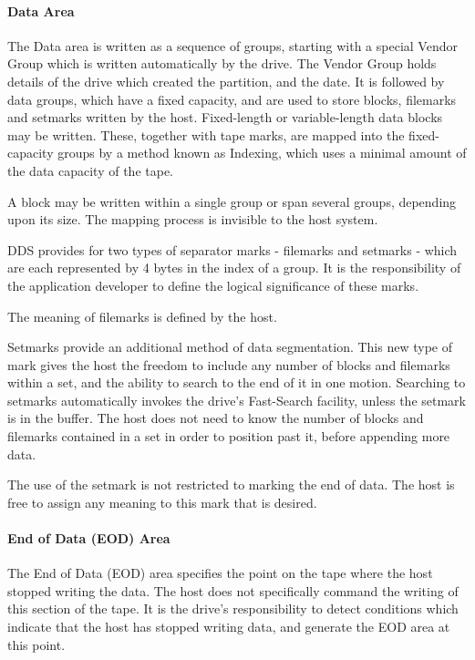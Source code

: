 \paragraph {Data Area}

The Data area is written as a sequence of groups, starting with a special
Vendor Group which is written automatically by the drive. The Vendor Group
holds details of the drive which created the partition, and the date. It is
followed by data groups, which have a fixed capacity, and are used to store
blocks, filemarks and setmarks written by the host. Fixed-length or
variable-length data blocks may be written. These, together with tape marks,
are mapped into the fixed-capacity groups by a method known as Indexing,
which uses a minimal amount of the data capacity of the tape.

A block may be written within a single group or span several groups,
depending upon its size. The mapping process is invisible to the host system.

DDS provides for two types of separator marks - filemarks and setmarks -
which are each represented by 4 bytes in the index of a group. It is the
responsibility of the application developer to define the logical
significance of these marks.

The meaning of filemarks is defined by the host.

Setmarks provide an additional method of data segmentation. This new type
of mark gives the host the freedom to include any number of blocks and
filemarks within a set, and the ability to search to the end of it in one
motion. Searching to setmarks automatically invokes the drive's Fast-Search
facility, unless the setmark is in the buffer. The host does not need to
know the number of blocks and filemarks contained in a set in order to
position past it, before appending more data.

The use of the setmark is not restricted to marking the end of data. The
host is free to assign any meaning to this mark that is desired.

\paragraph {End of Data (EOD) Area}

The End of Data (EOD) area specifies the point on the tape where the host
stopped writing the data. The host does not specifically command the writing
of this section of the tape. It is the drive's responsibility to detect
conditions which indicate that the host has stopped writing data, and generate
the EOD area at this point.

